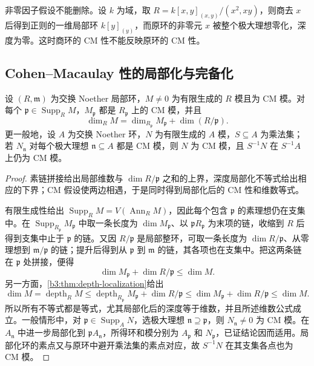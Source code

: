 非零因子假设不能删除。设 \(k\) 为域，取 \(R=k[x,y]_{(x,y)}/(x^2,xy)\)，则商去 \(x\) 后得到正则的一维局部环 \(k[y]_{(y)}\)，而原环的非零元 \(x\) 被整个极大理想零化，深度为零。这时商环的 CM 性不能反映原环的 CM 性。

\subsection{Cohen–Macaulay 性的局部化与完备化}
\label{b3:subsec:1902:02}

\begin{theorem}\label{b3:thm:cm-localization}
	设 \((R,\mathfrak m)\) 为交换 Noether 局部环，\(M\ne0\) 为有限生成的 \(R\) 模且为 CM 模。对每个 \(\mathfrak p\in\operatorname{Supp}_RM\)，\(M_{\mathfrak p}\) 都是 \(R_{\mathfrak p}\) 上的 CM 模，并且
	\[
		\dim_RM=\dim_{R_{\mathfrak p}}M_{\mathfrak p}+\dim(R/\mathfrak p).
	\]
	更一般地，设 \(A\) 为交换 Noether 环，\(N\) 为有限生成的 \(A\) 模，\(S\subseteq A\) 为乘法集；若 \(N_{\mathfrak n}\) 对每个极大理想 \(\mathfrak n\subseteq A\) 都是 CM 模，则 \(N\) 为 CM 模，且 \(S^{-1}N\) 在 \(S^{-1}A\) 上仍为 CM 模。
\end{theorem}
\begin{proof}
	素链拼接给出局部维数与 \(\dim R/\mathfrak p\) 之和的上界，深度局部化不等式给出相应的下界；CM 假设使两边相遇，于是同时得到局部化后的 CM 性和维数等式。

	有限生成性给出 \(\operatorname{Supp}_RM=V(\operatorname{Ann}_RM)\)，因此每个包含 \(\mathfrak p\) 的素理想仍在支集中。在 \(\operatorname{Supp}_{R_{\mathfrak p}}M_{\mathfrak p}\) 中取一条长度为 \(\dim M_{\mathfrak p}\)、以 \(\mathfrak pR_{\mathfrak p}\) 为末项的链，收缩到 \(R\) 后得到支集中止于 \(\mathfrak p\) 的链。又因 \(R/\mathfrak p\) 是局部整环，可取一条长度为 \(\dim R/\mathfrak p\)、从零理想到 \(\mathfrak m/\mathfrak p\) 的链；提升后得到从 \(\mathfrak p\) 到 \(\mathfrak m\) 的链，其各项也在支集中。把这两条链在 \(\mathfrak p\) 处拼接，便得
	\[
		\dim M_{\mathfrak p}+\dim R/\mathfrak p\le\dim M.
	\]
	另一方面，\cref{b3:thm:depth-localization}给出
	\[
		\dim M=\operatorname{depth}_RM \le\operatorname{depth}_{R_{\mathfrak p}}M_{\mathfrak p}+\dim R/\mathfrak p \le\dim M_{\mathfrak p}+\dim R/\mathfrak p \le\dim M.
	\]
	所以所有不等式都是等式，尤其局部化后的深度等于维数，并且所述维数公式成立。一般情形中，对 \(\mathfrak p\in\operatorname{Supp}_AN\)，选极大理想 \(\mathfrak n\supseteq\mathfrak p\)，则 \(N_{\mathfrak n}\ne0\) 为 CM 模。在 \(A_{\mathfrak n}\) 中进一步局部化到 \(\mathfrak pA_{\mathfrak n}\)，所得环和模分别为 \(A_{\mathfrak p}\) 和 \(N_{\mathfrak p}\)，已证结论因而适用。局部化环的素点又与原环中避开乘法集的素点对应，故 \(S^{-1}N\) 在其支集各点也为 CM 模。
\end{proof}

